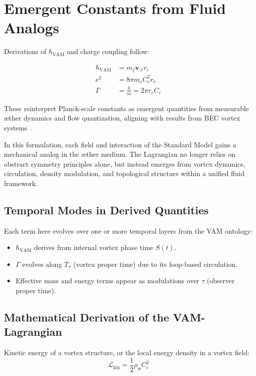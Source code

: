\section{Emergent Constants from Fluid Analogs}
Derivations of $\hbar_{\text{VAM}}$ and charge coupling follow:

\begin{align}
    \hbar_{\text{VAM}} &= m_f \mathbf{v}_{\scriptscriptstyle\boldsymbol{\circlearrowleft}} r_c \\
    e^2 &= 8\pi m_e C_e^2 r_c \\
    \Gamma &= \frac{h}{m} = 2\pi r_c C_e
\end{align}

These reinterpret Planck-scale constants as emergent quantities from measurable \ae{}ther dynamics and flow quantization, aligning with results from BEC vortex systems~\cite{Pethick2008BEC, Donnelly1991QuantizedVortices}.

In this formulation, each field and interaction of the Standard Model gains a mechanical analog in the \ae{}ther medium. The Lagrangian no longer relies on abstract symmetry principles alone, but instead emerges from vortex dynamics, circulation, density modulation, and topological structure within a unified fluid framework.

\subsection{Temporal Modes in Derived Quantities}
Each term here evolves over one or more temporal layers from the VAM ontology:
\begin{itemize}
    \item $\hbar_{\text{VAM}}$ derives from internal vortex phase time $S(t)$.
    \item $\Gamma$ evolves along $T_v$ (vortex proper time) due to its loop-based circulation.
    \item Effective mass and energy terms appear as modulations over $\tau$ (observer proper time).
\end{itemize}

\subsection{Mathematical Derivation of the VAM-Lagrangian}

Kinetic energy of a vortex structure, or the local energy density in a vortex field:
\[
    \mathcal{L}_\text{kin} = \frac{1}{2}\rho_\text{\ae} C_e^2
\]

